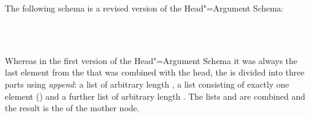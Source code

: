 The following schema is a revised version of the Head"=Argument Schema:
\begin{samepage}
\begin{schema}
\label{schema-bin-prel2}
~\\
 \impl\\
\end{schema}
\end{samepage}
Whereas in the first version of the Head"=Argument Schema it was always the last element from the \subcatl that was combined with the head,
the \subcatl is divided into three parts using \emph{append}: a list of arbitrary length ,
a list consisting of exactly one element () and a further list of arbitrary length . The lists  and 
are combined and the result is the \subcatv of the mother node.


